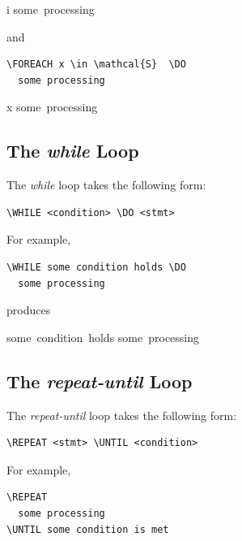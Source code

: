 \documentclass[a4]{article}
\begin{document}
\medskip
\begin{pseudocode}[display]{}{}
\FOR i   \DO
\mbox{some processing}
\end{pseudocode}

\noindent{}and

\begin{verbatim}
\FOREACH x \in \mathcal{S}  \DO
  some processing 
\end{verbatim}


\medskip
\begin{pseudocode}[display]{}{}
\FOREACH x \in {}  \DO
  \mbox{some processing}
\end{pseudocode}

\subsection{The {\em while} Loop}

The {\em while} loop takes the following form:

\begin{verbatim}
\WHILE <condition> \DO <stmt> 
\end{verbatim}

\noindent{}For example,

\begin{verbatim}
\WHILE some condition holds \DO 
  some processing 
\end{verbatim}

\noindent{}produces

\medskip
\begin{pseudocode}[display]{}{}
\WHILE \mbox{some condition holds} \DO 
\mbox{some processing }
\end{pseudocode}

\subsection{The {\em repeat-until} Loop}

The {\em repeat-until} loop takes the following form:

\begin{verbatim}
\REPEAT <stmt> \UNTIL <condition> 
\end{verbatim}

\noindent{}For example,

\begin{verbatim}
\REPEAT
  some processing 
\UNTIL some condition is met 
\end{verbatim}
\end{document}
